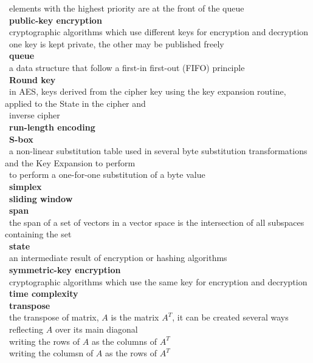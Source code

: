 \documentclass[10pt,letterpaper]{scrartcl}
\newcommand{\tbul}{\textbullet}
\newcommand{\tend}{\>\textendash}
\newcommand{\tasc}{\>\>\textasteriskcentered}
\begin{document}
\begin{tabbing}
\tend\ elements with the highest priority are at the front of the queue \\
\tbul\ \textbf{public-key encryption} \\
\tend\ cryptographic algorithms which use different keys for encryption and decryption \\
\tend\ one key is kept private, the other may be published freely \\
\tbul\ \textbf{queue} \\
\tend\ a data structure that follow a first-in first-out (FIFO) principle \\
\tbul\ \textbf{Round key} \\
\tend\ in AES, keys derived from the cipher key using the key expansion routine, applied to the State in the cipher and \\ \>\ inverse cipher \\
\tbul\ \textbf{run-length encoding} \\
\tbul\ \textbf{S-box} \\
\tend\ a non-linear substitution table used in several byte substitution transformations and the Key Expansion to perform \\ \>\ to perform a one-for-one substitution of a byte value \\
\tbul\ \textbf{simplex} \\
\tbul\ \textbf{sliding window} \\
\tbul\ \textbf{span} \\
\tend\ the span of a set of vectors in a vector space is the intersection of all subspaces containing the set \\
\tbul\ \textbf{state} \\
\tend\ an intermediate result of encryption or hashing algorithms \\
\tbul\ \textbf{symmetric-key encryption} \\
\tend\ cryptographic algorithms which use the same key for encryption and decryption \\
\tbul\ \textbf{time complexity} \\
\tbul\ \textbf{transpose} \\
\tend\ the transpose of matrix, $A$ is the matrix $A^T$, it can be created several ways \\
\tasc\ reflecting $A$ over its main diagonal \\
\tasc\ writing the rows of $A$ as the columns of $A^T$ \\
\tasc\ writing the columsn of $A$ as the rows of $A^T$ \\

\end{tabbing}
\end{document}
